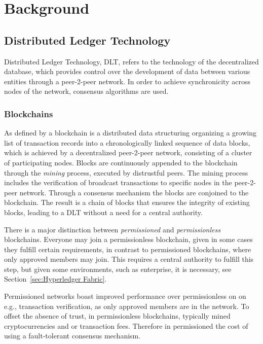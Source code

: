 \chapter{Background}
\label{chap:Background}


\section{Distributed Ledger Technology} %
\label{sec:Distributed Ledger Technology}

Distributed Ledger Technology, DLT, refers to the technology of the decentralized database, which provides control over
the development of data between various entities through a peer-2-peer network. In order to achieve synchronicity across
nodes of the network, consensus algorithms are used.

\subsection{Blockchains} %
\label{sub:Blockchains}
As defined by \cite{diam-iot-2020} a blockchain is a distributed data structuring organizing a growing list of
transaction records into a chronologically linked sequence of data blocks, which is achieved by a decentralized
peer-2-peer network, consisting of a cluster of participating nodes. Blocks are continuously appended to the blockchain
through the \textit{mining} process, executed by distrustful peers. The mining process includes the verification of
broadcast transactions to specific nodes in the peer-2-peer network. Through a consensus mechanism the blocks are
conjoined to the blockchain. The result is a chain of blocks that ensures the integrity of existing blocks, leading to a
DLT without a need for a central authority.

There is a major distinction between \textit{permissioned} and \textit{permissionless} blockchains.
Everyone may join a permissionless blockchain, given in some cases they fulfill certain requirements, in contrast to
permissioned blockchains, where only approved members may join. \cite{hyperledger:aries-rfc} This requires a central
authority to fulfill this step, but given some environments, such as enterprise, it is necessary, see
Section~\ref{sec:Hyperledger Fabric}.

Permissioned networks boast improved performance over permissionless on on e.g., transaction verification, as only
approved members are in the network. To offset the absence of trust, in permissionless blockchains, typically mined
cryptocurrencies and or transaction fees. Therefore in permissioned the cost of using a fault-tolerant consensus
mechanism.

